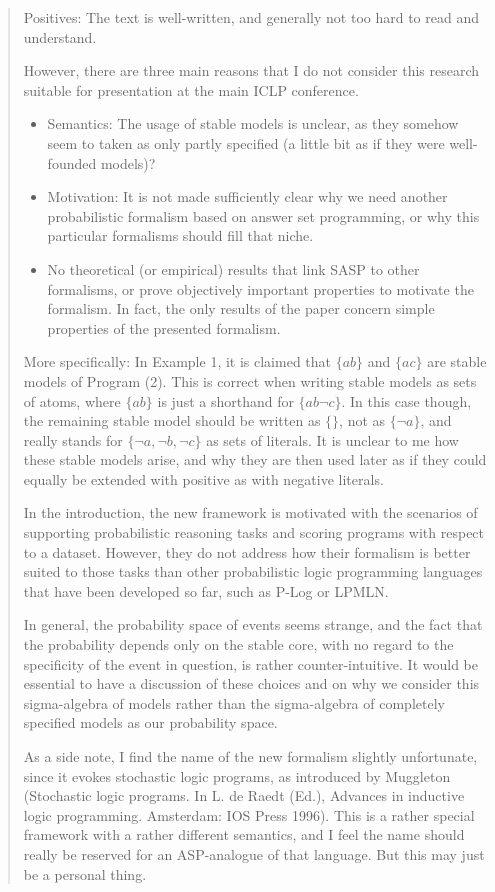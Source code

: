 \documentclass{tlp}
\begin{document}
\begin{quotation}
Positives:
The text is well-written, and generally not too hard to read and understand.

However, there are three main reasons that I do not consider this research suitable for presentation at the main ICLP conference.

\begin{itemize}
  \item Semantics: The usage of stable models is unclear, as they somehow seem to taken as only partly specified (a little bit as if they were well-founded models)?
  \item Motivation: It is not made sufficiently clear why we need another probabilistic formalism based on answer set programming, or why this particular formalisms should fill that niche.
  \item No theoretical (or empirical) results that link SASP to other formalisms, or prove objectively important properties to motivate the formalism. In fact, the only results of the paper concern simple properties of the presented formalism.
\end{itemize}

More specifically:
In Example 1, it is claimed that $\{ab\}$ and $\{ac\}$ are stable models of Program (2). This is correct when writing stable models as sets of atoms, where $\{ab\}$ is just a shorthand for $\{ab \neg c\}$. In this case though, the remaining stable model should be written as $\{\}$, not as $\{\neg a\}$, and really stands for $\{\neg a, \neg b, \neg c\}$ as sets of literals. It is unclear to me how these stable models arise, and why they are then used later as if they could equally be extended with positive as with negative literals.

In the introduction, the new framework is motivated with the scenarios of supporting probabilistic reasoning tasks and scoring programs with respect to a dataset. However, they do not address how their formalism is better suited to those tasks than other probabilistic logic programming languages that have been developed so far, such as P-Log or LPMLN.

In general, the probability space of events seems strange, and the fact that the probability depends only on the stable core, with no regard to the specificity of the event in question, is rather counter-intuitive. It would be essential to have a discussion of these choices and on why we consider this sigma-algebra of models rather than the sigma-algebra of completely specified models as our probability space.

As a side note, I find the name of the new formalism slightly unfortunate, since it evokes stochastic logic programs, as introduced by Muggleton (Stochastic logic programs. In L. de Raedt (Ed.), Advances in inductive logic programming. Amsterdam: IOS Press 1996). This is a rather special framework with a rather different semantics, and I feel the name should really be reserved for an ASP-analogue of that language. But this may just be a personal thing.
  
\end{quotation}
\end{document}
